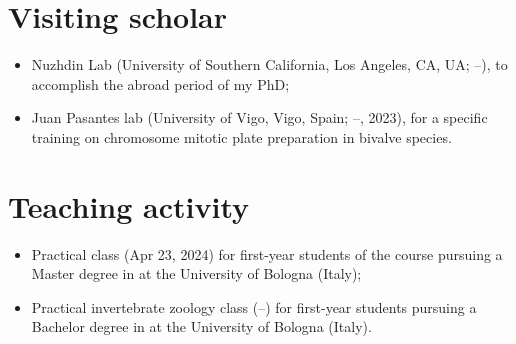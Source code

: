 \section*{Visiting scholar}
\begin{itemize}
    \item Nuzhdin Lab (University of Southern California, Los Angeles, CA, UA; --), to accomplish the abroad period of my PhD;
    \item Juan Pasantes\curlyapostrophe{} lab (University of Vigo, Vigo, Spain;  --, 2023), for a specific training on chromosome mitotic plate preparation in bivalve species.
\end{itemize}

\section*{Teaching activity}
\begin{itemize}
    \item Practical class  (Apr 23, 2024) for first-year students of the course  pursuing a Master degree in  at the University of Bologna (Italy);
    \item Practical invertebrate zoology class (--) for first-year students pursuing a Bachelor degree in  at the University of Bologna (Italy).
\end{itemize}

